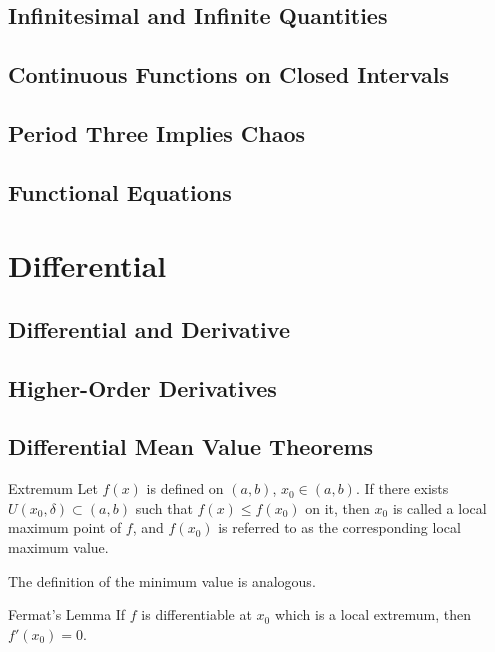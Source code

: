 \documentclass[11pt]{elegantbook}
\begin{document}
\section{Infinitesimal and Infinite Quantities}

\section{Continuous Functions on Closed Intervals}

\section{Period Three Implies Chaos}

\section{Functional Equations}

\chapter{Differential}
\section{Differential and Derivative}

\section{Higher-Order Derivatives}

\section{Differential Mean Value Theorems}
\begin{definition}{Extremum}
    Let \(f(x)\) is defined on \((a,b)\), \(x_{0}\in (a,b)\).
    If there exists \(U(x_{0}, \delta)\subset (a,b)\) such that \(f(x)\leqslant f(x_{0})\) on it,
    then \(x_{0}\) is called a local maximum point of \(f\),
    and \(f(x_{0})\) is referred to as the corresponding local maximum value.

    The definition of the minimum value is analogous.
\end{definition}

\begin{lemma}{Fermat's Lemma}
    If \(f\) is differentiable at \(x_{0}\) which is a local extremum, then \(f'(x_{0}) = 0\).
\end{lemma}
\end{document}
